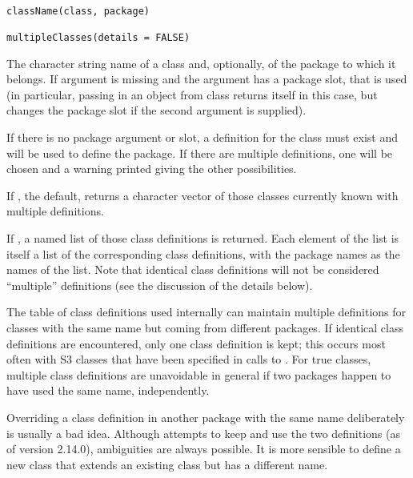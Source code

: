 %
\begin{Usage}
\begin{verbatim}

className(class, package)

multipleClasses(details = FALSE)
\end{verbatim}
\end{Usage}
%
\begin{Arguments}
\begin{ldescription}

\item[\code{class, package}] 
The character string name of a class and, optionally, of the package
to which it belongs.  If argument  is missing and the
 argument has a package slot, that is used  (in
particular, passing in an object from class  returns
itself in this case, but changes the package slot if the second
argument is supplied).

If there is no package argument or slot, a
definition for the class must exist and will be used to define the
package.  If there are multiple definitions, one will be chosen and a
warning printed giving the other possibilities.


\item[\code{details}] 
If , the default,  returns a
character vector of those classes currently known with multiple
definitions.

If , a named list of those class definitions is returned.
Each element of the list is itself a list of the corresponding class
definitions, with the package names as the names of the list.  Note
that identical class definitions will not be considered
``multiple'' definitions (see the discussion of the details below).

\end{ldescription}
\end{Arguments}
%
\begin{Details}\relax
The table of class definitions used internally can maintain multiple
definitions for classes with the same name but coming from different
packages.
If identical class definitions are encountered, only one class
definition is kept; this occurs most often with S3 classes that have
been specified in calls to .  For true
classes, multiple class definitions are unavoidable in general if two
packages happen to have used the same name, independently.

Overriding a class definition in another package with the same name deliberately is usually a bad
idea.
Although \R{} attempts to keep and use the two definitions (as of
version 2.14.0), ambiguities are always possible.  It is more
sensible to define a new class that extends an existing class but has
a different name.
\end{Details}
